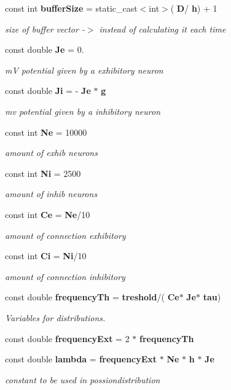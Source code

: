 \begin{DoxyCompactItemize}
const int \textbf{ buffer\+Size} = static\+\_\+cast$<$int$>$(\textbf{ D}/\textbf{ h}) + 1
\begin{DoxyCompactList}\small\item\em size of buffer vector -\/$>$ instead of calculating it each time \end{DoxyCompactList}\item 
const double \textbf{ Je} = 0.
\begin{DoxyCompactList}\small\item\em mV potential given by a exhibitory neuron \end{DoxyCompactList}\item 
const double \textbf{ Ji} = -\/\textbf{ Je} $\ast$ \textbf{ g}
\begin{DoxyCompactList}\small\item\em mv potential given by a inhibitory neuron \end{DoxyCompactList}\item 
const int \textbf{ Ne} = 10000
\begin{DoxyCompactList}\small\item\em amount of exhib neurons \end{DoxyCompactList}\item 
const int \textbf{ Ni} = 2500
\begin{DoxyCompactList}\small\item\em amount of inhib neurons \end{DoxyCompactList}\item 
const int \textbf{ Ce} = \textbf{ Ne}/10
\begin{DoxyCompactList}\small\item\em amount of connection exhibitory \end{DoxyCompactList}\item 
const int \textbf{ Ci} = \textbf{ Ni}/10
\begin{DoxyCompactList}\small\item\em amount of connection inhibitory \end{DoxyCompactList}\item 
const double \textbf{ frequency\+Th} = \textbf{ treshold}/(\textbf{ Ce}$\ast$\textbf{ Je}$\ast$\textbf{ tau})
\begin{DoxyCompactList}\small\item\em Variables for distributions. \end{DoxyCompactList}\item 
const double \textbf{ frequency\+Ext} = 2 $\ast$ \textbf{ frequency\+Th}
\item 
const double \textbf{ lambda} = \textbf{ frequency\+Ext} $\ast$ \textbf{ Ne} $\ast$ \textbf{ h} $\ast$ \textbf{ Je}
\begin{DoxyCompactList}\small\item\em constant to be used in possiondistribution \end{DoxyCompactList}\end{DoxyCompactItemize}


